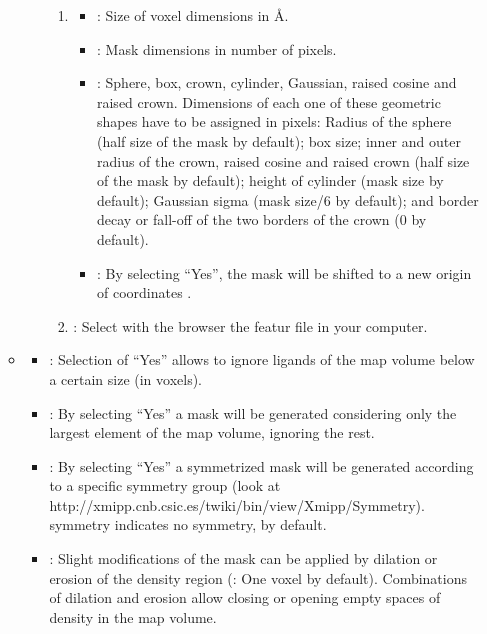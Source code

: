 \begin{itemize}
\begin{itemize}
\begin{itemize}
\begin{enumerate}
                    \item {}
                            \begin{itemize}
                            \item {}: Size of voxel dimensions in \AA.
                            \item {}: Mask dimensions in number of pixels.
                            \item {}: Sphere, box, crown, cylinder, Gaussian, raised cosine and raised crown. Dimensions of each one of these geometric shapes have to be assigned in pixels: Radius of the sphere (half size of the mask by default); box size; inner and outer radius of the crown, raised cosine and raised crown (half size of the mask by default); height of cylinder (mask size by default); Gaussian sigma (mask size/6 by default); and border decay or fall-off of the two borders of the crown (0 by default).
                            \item {}: By selecting ``Yes'', the mask will be shifted to a new origin of coordinates .
                            \end{itemize}  
                    \item {}: Select with the browser the featur file in your computer.
                \end{enumerate}  
            \end{itemize} 
        \item {}
                \begin{itemize}
                \item {}: Selection of ``Yes'' allows to ignore ligands of the map volume below a certain size (in voxels).
                \item {}: By selecting ``Yes'' a mask will be generated considering only the largest element of the map volume, ignoring the rest.
                \item {}: By selecting ``Yes'' a symmetrized mask will be generated according to a specific symmetry group (look at http://xmipp.cnb.csic.es/twiki/bin/view/Xmipp/Symmetry).  symmetry indicates no symmetry, by default.
                \item {}: Slight modifications of the mask can be applied by dilation or erosion of the density region (: One voxel by default). Combinations of dilation and erosion allow closing or opening empty spaces of density in the map volume.

\end{itemize}
\end{itemize}
\end{itemize}
